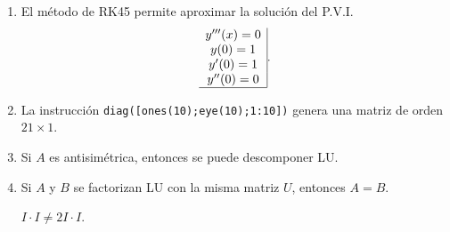 \documentclass[11pt]{article}
\begin{document}
\begin{enumerate}
\begin{enumerate}
\begin{minipage}{0.4\textwidth}
    \end{minipage}
%
\item
\fbox{ \begin{minipage}{1cm}    \hfill\vspace{1cm}   		
    \end{minipage} } 
    \begin{minipage}{0.4\textwidth}
	El método de RK45 permite aproximar la soluci\'on del P.V.I. 
    $$
    \begin{array}{c|}
    y'''(x)=0\\
    y(0)=1  \\
    y'(0)=1 \\
    y''(0)=0\\ \hline
    \end{array}.
    $$
    \end{minipage} 
    \begin{minipage}{0.4\textwidth}
    \end{minipage}
%
\item
\fbox{ \begin{minipage}{1cm}  \hfill\vspace{1cm}   		
    \end{minipage} } 
    \begin{minipage}{0.4\textwidth}
	La instrucci\'on 
    \texttt{diag([ones(10);eye(10);1:10])}
    genera una matriz de orden $21\times1$.
    \end{minipage} 
    \begin{minipage}{0.4\textwidth}
    \end{minipage}
\item
{} 
    \begin{minipage}{0.4\textwidth}
	Si $A$ es antisim\'etrica, entonces se puede descomponer LU.
    \end{minipage} 
    \begin{minipage}{0.4\textwidth}
    \end{minipage}
%
\item
{} 
    \begin{minipage}{0.4\textwidth}
	Si $A$ y $B$ se factorizan LU con la misma matriz $U$, entonces $A=B$.
	\end{minipage} 
    \begin{minipage}{0.4\textwidth}
    $I\cdot I\neq 2I\cdot I$.
    \end{minipage}
\end{enumerate}


\end{enumerate}
\end{document}

